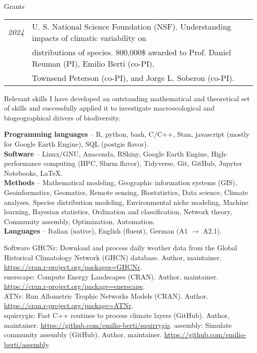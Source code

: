 \documentclass{resume} %
\begin{document}
\begin{rSection}{Grants}
\begin{tabular}{l l}
{\em 2024} & U. S. National Science Foundation (NSF). Understanding impacts of climatic variability on\\
           & distributions of species. 800,000\$ awarded to Prof. Daniel Reuman (PI), Emilio Berti (co-PI),\\
           & Townsend Peterson (co-PI), and Jorge L. Soberon (co-PI).
\end{tabular}
\end{rSection}

\begin{rSection}{Relevant skills}
I have developed an outstanding mathematical and theoretical set of skills and successfully applied it to
investigate macroecological and biogeographical drivers of biodiversity.

\textbf{Programming languages} – R, python, bash, C/C++, Stan, javascript (mostly for Google Earth Engine), SQL (postgis flavor).\\
\textbf{Software} – Linux/GNU, Anaconda, RShiny, Google Earth Engine, High-performance computing (HPC, Slurm flavor), Tidyverse, Git, GitHub, Jupyter Notebooks, \LaTeX.\\
\textbf{Methods} – Mathematical modeling, Geographic information systems (GIS), Geoinformatics, Geomatics, Remote sensing, Biostatistics, Data science, Climate analyses, Species distribution modeling, Environmental niche modeling, Machine learning, Bayesian statistics, Ordination and classification, Network theory,
Community assembly, Optimization, Automation.\\
\textbf{Languages} – Italian (native), English (fluent), German (A1 $\rightarrow$ A2.1).
\end{rSection}

\begin{rSection}{Software}
GHCNr: Download and process daily weather data from the Global Historical Climatology Network (GHCN) database. Author, maintainer. \url{https://cran.r-project.org/packages=GHCNr}.\\
enerscape: Compute Energy Landscapes (CRAN). Author, maintainer. \url{https://cran.r-project.org/package=enerscape}.\\
ATNr: Run Allometric Trophic Networks Models (CRAN). Author. \url{https://cran.r-project.org/package=ATNr}.\\
squirrygis: Fast C++ routines to process climate layers (GitHub). Author, maintainer. \url{https://github.com/emilio-berti/squirrygis}.
assembly: Simulate community assembly (GitHub). Author, maintainer. \url{https://github.com/emilio-berti/assembly}.
\end{rSection}
\end{document}
